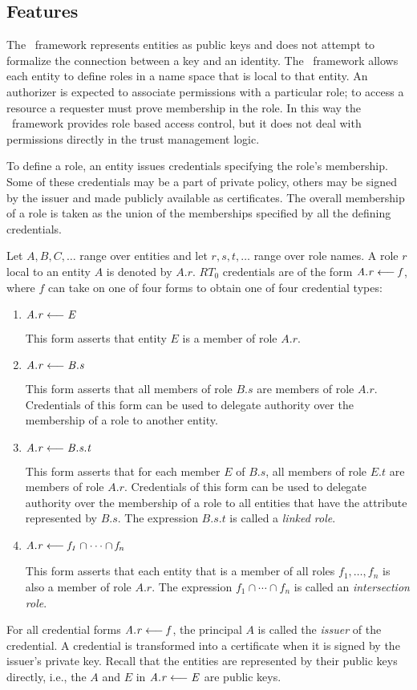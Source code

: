 \subsection{Features}

The \RT\ framework represents entities as public keys and does not attempt to formalize the
connection between a key and an identity. The \RT\ framework allows each entity to define roles
in a name space that is local to that entity. An authorizer is expected to associate permissions
with a particular role; to access a resource a requester must prove membership in the role. In
this way the \RT\ framework provides role based access control, but it does not deal with
permissions directly in the trust management logic.

To define a role, an entity issues credentials specifying the role's membership. Some of these
credentials may be a part of private policy, others may be signed by the issuer and made
publicly available as certificates. The overall membership of a role is taken as the union of
the memberships specified by all the defining credentials.

Let $A, B, C, \ldots$ range over entities and let $r, s, t, \ldots$ range over role names. A
role $r$ local to an entity $A$ is denoted by $A.r$. $RT_0$ credentials are of the form
$\mathit{A.r} \stackrel{}{\longleftarrow} \mathit{f}$, where $f$ can take on one of four forms to obtain one of four credential
types:
\begin{enumerate}

\item $\mathit{A.r} \stackrel{}{\longleftarrow} \mathit{E}$ 

 This form asserts that entity $E$ is a member of role $A.r$.

\item $\mathit{A.r} \stackrel{}{\longleftarrow} \mathit{B.s}$ 

  This form asserts that all members of role $B.s$ are members of role $A.r$. Credentials of
  this form can be used to delegate authority over the membership of a role to another entity.

\item $\mathit{A.r} \stackrel{}{\longleftarrow} \mathit{B.s.t}$ 

  This form asserts that for each member $E$ of $B.s$, all members of role $E.t$ are members of
  role $A.r$. Credentials of this form can be used to delegate authority over the membership of
  a role to all entities that have the attribute represented by $B.s$. The expression $B.s.t$ is
  called a \emph{linked role}.

\item $\mathit{A.r} \stackrel{}{\longleftarrow} \mathit{f_1 \cap \cdots \cap f_n}$
  
  This form asserts that each entity that is a member of all roles $f_1,\ldots, f_n$ is also a
  member of role $A.r$. The expression $f_1 \cap \cdots \cap f_n$ is called an
  \emph{intersection role}.

\end{enumerate}
For all credential forms $\mathit{A.r} \stackrel{}{\longleftarrow} \mathit{f}$, the principal $A$ is called the \emph{issuer} of the
credential. A credential is transformed into a certificate when it is signed by the issuer's
private key. Recall that the entities are represented by their public keys directly, i.e., the
$A$ and $E$ in $\mathit{A.r} \stackrel{}{\longleftarrow} \mathit{E}$ are public keys.

